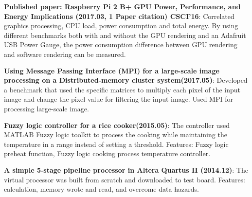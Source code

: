 \documentclass[letterpaper,11pt]{article}
\newcommand{\resumeItem}[2]{
  \item\small{
    \textbf{#1}{: #2 \vspace{-2pt}}
  }
}
\newcommand{\resumeSubItem}[2]{\resumeItem{#1}{#2}\vspace{-4pt}}
\begin{document}
    \resumeSubItem{Published paper: Raspberry Pi 2 B+ GPU Power, Performance, and Energy Implications (2017.03, 1 Paper citation) CSCI'16}
      {Correlated graphics processing, CPU load, power consumption and total energy. By using different benchmarks both with and without the GPU rendering and an Adafruit USB Power Gauge, the power consumption difference between GPU rendering and software rendering can be measured.}

      
      \resumeSubItem{Using Message Passing Interface (MPI) for a large-scale image processing on a Distributed-memory cluster system(2017.05)}
      {Developed a benchmark that used the specific matrices to multiply each pixel of the input image and change the pixel value for filtering the input image. Used MPI for processing large-scale image.}

    \resumeSubItem{Fuzzy logic controller for a rice cooker(2015.05)}
    {The controller used MATLAB Fuzzy logic toolkit to process the cooking while maintaining the temperature in a range instead of setting a threshold. Features: Fuzzy logic preheat function, Fuzzy logic cooking process temperature controller.}

    \resumeSubItem{A simple 5-stage pipeline processor in Altera Quartus II (2014.12)}
    {The virtual processor was built from scratch and downloaded to test board. Features: calculation, memory wrote and read, and overcome data hazards.}
\end{document}
